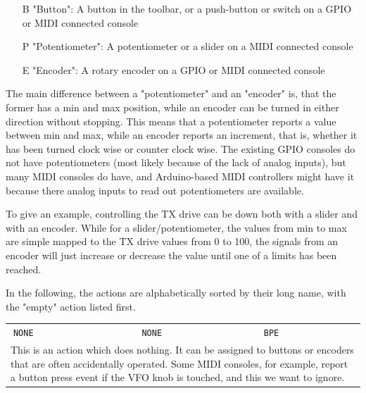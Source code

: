 \documentclass[12pt]{book}
\def\bltt#1{\texttt{\color{blue}#1}}
\begin{document}
\begin{itemize}[font=\texttt, left=0pt]
\item[B] {"Button": A button in the toolbar, or a push-button or switch on a GPIO or MIDI connected console}
\item[P] {"Potentiometer": A potentiometer or a slider on a MIDI connected console}
\item[E] {"Encoder": A rotary encoder on a GPIO or MIDI connected console}
\end{itemize}

The main difference between a "potentiometer" and an "encoder" is, that the former has a min and max 
position, while
an encoder can be turned in either direction without stopping. This means that a potentiometer
reports a value between min and max, while an encoder reports an increment,
that is, whether it has been turned clock wise or counter clock wise.
The existing GPIO consoles do not have potentiometers (most likely because of the lack of analog inputs), 
but
many MIDI consoles do have, and Arduino-based MIDI controllers might have it because there analog inputs
to read out potentiometers are available.

To give an example, controlling the TX drive can be down both with a slider and with an encoder. While for
a slider/potentiometer, the values from min to max are simple mapped to the TX drive values from 0 to 100,
the signals from an encoder will just increase or decrease the value until one of a limits has been reached.

In the following, the actions are alphabetically sorted by their long name, with the "empty" action listed
first.

\renewcommand{\belowrulesep}{0pt}
\renewcommand{\aboverulesep}{0pt}
\def\action#1#2#3#4{
\begin{center}
\begin{tabular}{|p{7cm}|p{3cm}|p{1cm}|}
\toprule
$\phantom{\Big|}$\bltt{\large #1} & \texttt{\large #2} & \texttt{\large #3} \\\cline{1-3}
\multicolumn{3}{|p{\textwidth}|}{#4} \\
\bottomrule
\end{tabular}
\end{center}
}


\action{NONE}{NONE}{BPE}{This is an action which does nothing. It can be assigned to buttons or enco\-ders 
that
are often accidentally operated. Some MIDI consoles, for example, report a button press event if the VFO
knob is touched, and this we want to ignore.}
\end{document}
